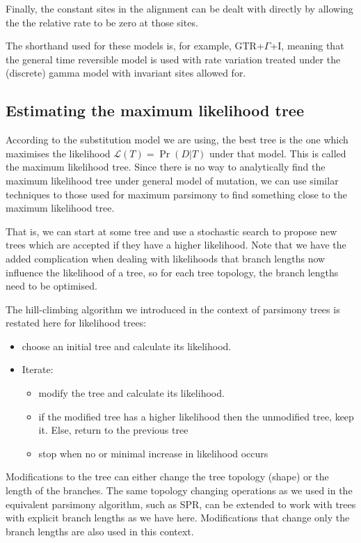 \documentclass[11pt]{article}
\begin{document}
Finally, the constant sites in the alignment can be dealt with directly by allowing the the relative rate to be zero at those sites.

The shorthand used for these models is, for example, GTR+$\Gamma$+I, meaning that the general time reversible model is used with rate variation treated under the (discrete) gamma model with invariant sites allowed for.  



 
 \subsection{Estimating the maximum likelihood tree}
 
According to the substitution model we are using, the best tree is the one which maximises the likelihood $\mathcal L(T) = \Pr(D|T)$ under that model.  This is called the maximum likelihood tree.     Since there is no way to analytically find the maximum likelihood tree under general model of mutation,   we can use similar techniques to those used for maximum parsimony to find something close to the maximum likelihood tree.   

That is, we can start at some tree and use a stochastic search to propose new trees which are accepted if they have a higher likelihood. Note that we have the added complication when dealing with likelihoods that branch lengths now influence the likelihood of a tree, so for each tree topology, the branch lengths need to be optimised.
 
The hill-climbing algorithm we introduced in the context of parsimony trees is restated here for likelihood trees:

\begin{itemize}
\item    choose an initial tree and calculate its likelihood.
  \item Iterate: \begin{itemize} \item modify the tree and calculate its likelihood.
  \item  if the modified tree has a higher likelihood then the unmodified tree, keep it. Else, return to the previous tree
  \item  stop when no or minimal increase in likelihood occurs
\end{itemize}
\end{itemize}

Modifications to the tree can either change the tree topology (shape) or the length of the branches.  The same topology changing operations as we used in the equivalent parsimony algorithm,  such as SPR, can be  extended to work with trees with explicit branch lengths as we have here.  Modifications that change only the branch lengths are also used in this context.
 
\end{document}
